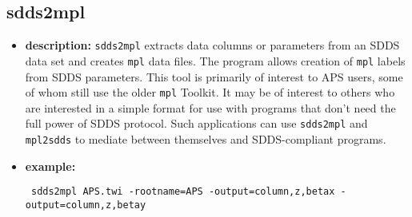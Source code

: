 \begin{latexonly}
\newpage
\end{latexonly}
\subsection{sdds2mpl}
\label{sdds2mpl}

\begin{itemize}
\item {\bf description:} 
\verb|sdds2mpl| extracts data columns or parameters from an SDDS data set and creates \verb|mpl| data files.  The 
program allows creation of \verb|mpl| labels from SDDS parameters.  This tool is primarily of interest to APS
users, some of whom still use the older {\tt mpl} Toolkit.  It may be of interest to others who are interested in
a simple format for use with programs that don't need the full power of SDDS protocol.  Such applications can use
{\tt sdds2mpl} and {\tt mpl2sdds} to mediate between themselves and SDDS-compliant programs.

\item {\bf example:} 
\begin{flushleft}{\tt
sdds2mpl APS.twi -rootname=APS -output=column,z,betax -output=column,z,betay
}\end{flushleft}


\end{itemize}
